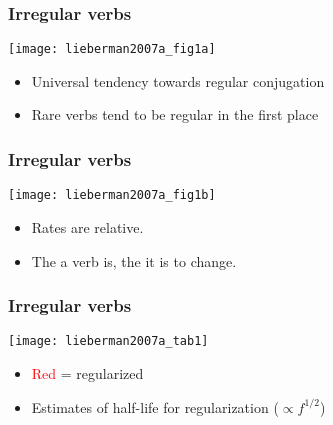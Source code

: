 \begin{frame}
  \frametitle{Irregular verbs}


  \begin{block}{}
    \texttt{[image: lieberman2007a\_fig1a]}

    \begin{itemize}
    \item 
      Universal tendency towards regular conjugation
    \item 
      Rare verbs tend to be regular in the first place
    \end{itemize}
  \end{block}

\end{frame}

\begin{frame}
  \frametitle{Irregular verbs}

  \begin{block}{}
    \texttt{[image: lieberman2007a\_fig1b]}

    \begin{itemize}
    \item<+->
      Rates are relative.
    \item<+->
      The  a verb is, the 
      it is to change.
    \end{itemize}
  \end{block}

\end{frame}

\begin{frame}[plain]
  \frametitle{Irregular verbs}

    \texttt{[image: lieberman2007a\_tab1]}

    \begin{itemize}
    \item 
      \textcolor{red}{Red} = regularized
    \item 
      Estimates of half-life for regularization ($\propto f^{1/2}$)
    \end{itemize}

\end{frame}

